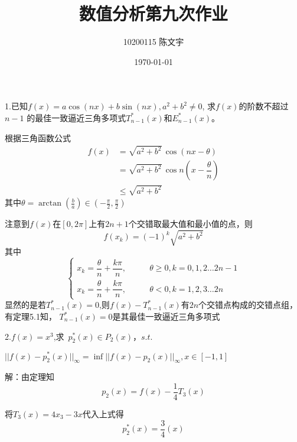 \documentclass[UTF8]{ctexart}
\begin{document}
\title{数值分析第九次作业}
%
\author{10200115 陈文宇}

\date{\today}

\maketitle{}

1.已知$f(x)=a \cos(nx) + b \sin(nx),a^{2}+b^{2} \neq 0 $,
  求$f(x)$的阶数不超过 $n-1$ 的最佳一致逼近三角多项式$T^{*}_{n-1}(x)$和$E^{*}_{n-1}(x)$。
  
  根据三角函数公式
  \begin{align*}
  	f(x)&= \sqrt{a^{2}+b^{2}} \, \cos(nx-\theta)\\
  		&= \sqrt{a^{2}+b^{2}} \, \cos n(x-\dfrac{\theta}{n})\\
  		&\leq \sqrt{a^{2}+b^{2}}
  \end{align*}
  其中$\theta = \arctan(\frac{b}{a}) \in (-\frac{\pi}{2},\frac{\pi}{2})$
  
  注意到$f(x)$在$[0,2\pi]$上有$2n+1$个交错取最大值和最小值的点，则
  $$f(x_{k})=(-1)^{k}\sqrt{a^{2}+b^{2}}$$
  其中
  \[
  \left\{
  \begin{aligned}
  	x_{k} = \dfrac{\theta}{n} + \dfrac{k\pi}{n},&\qquad\theta \geq 0,k=0,1,2\dots 2n-1\\
  	x_{k} = \dfrac{\theta}{n} + \dfrac{k\pi}{n},&\qquad\theta < 0,k=1,2,3\dots 2n
  \end{aligned}
  \right.
  \]
  显然的是若$T^{*}_{n-1}(x)=0$,则$f(x)-T^{*}_{n-1}(x)$有$2n$个交错点构成的交错点组，有定理5.1知，
  $T^{*}_{n-1}(x)=0$是其最佳一致逼近三角多项式\newpage

2.$f(x) = x^{3}$,求 \,$p^{*}_{2}(x) \in P_{2}(x)$，$s.t.$\\
\begin{center}
   $||f(x)-p^{*}_{2}(x)||_{\infty} = \inf ||f(x)-p_{2}(x)||_{\infty} ,x\in[-1,1]$ 
\end{center}
解：\quad 由定理知 $$p_{2}(x)=f(x)-\dfrac{1}{4}T_{3}(x)$$

将$T_{3}(x)=4x_{3}-3x$代入上式得$$p^{*}_{2}(x)=\frac{3}{4}(x)$$
\end{document}
